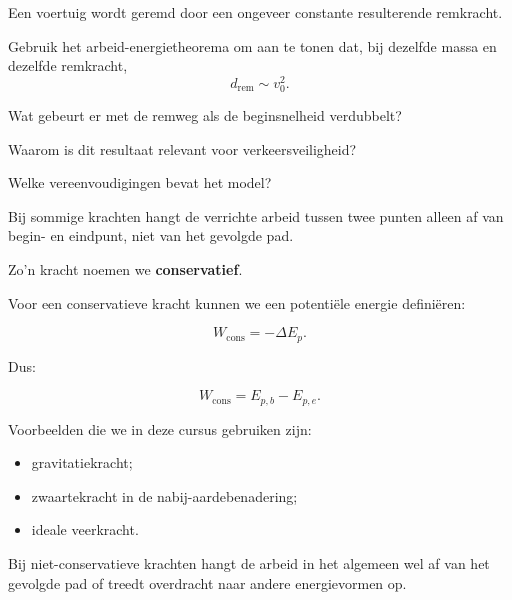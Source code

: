 \documentclass{ximera}
\begin{document}
\begin{oefening}[Remweg]{\oefU\ESS}

Een voertuig wordt geremd door een ongeveer constante resulterende remkracht.

\begin{question}
Gebruik het arbeid-energietheorema om aan te tonen dat, bij dezelfde massa en
dezelfde remkracht,
\[
d_{\mathrm{rem}}\sim v_0^2.
\]
\end{question}

\begin{question}
Wat gebeurt er met de remweg als de beginsnelheid verdubbelt?
\end{question}

\begin{question}
Waarom is dit resultaat relevant voor verkeersveiligheid?
\end{question}

\begin{question}
Welke vereenvoudigingen bevat het model?
\end{question}

\end{oefening}



Bij sommige krachten hangt de verrichte arbeid tussen twee punten alleen af
van begin- en eindpunt, niet van het gevolgde pad.

Zo'n kracht noemen we \textbf{conservatief}.

Voor een conservatieve kracht kunnen we een potentiële energie definiëren:

\[
\boxed{
W_{\mathrm{cons}}=-\Delta E_p.
}
\]

Dus:

\[
W_{\mathrm{cons}}
=
E_{p,b}-E_{p,e}.
\]

Voorbeelden die we in deze cursus gebruiken zijn:

\begin{itemize}
  \item gravitatiekracht;
  \item zwaartekracht in de nabij-aardebenadering;
  \item ideale veerkracht.
\end{itemize}



Bij niet-conservatieve krachten hangt de arbeid in het algemeen wel af van het
gevolgde pad of treedt overdracht naar andere energievormen op.
\end{document}
